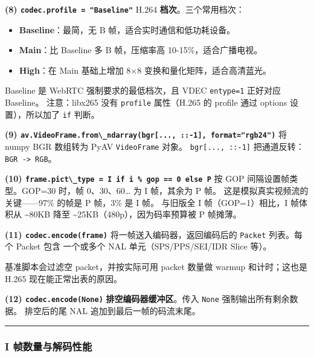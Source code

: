 \textbf{(8) \passthrough{\lstinline!codec.profile = "Baseline"!}} H.264
\textbf{档次}。三个常用档次：

\begin{itemize}
\tightlist
\item
  \textbf{Baseline}：最简，无 B 帧，适合实时通信和低功耗设备。
\item
  \textbf{Main}：比 Baseline 多 B 帧，压缩率高 10-15\%，适合广播电视。
\item
  \textbf{High}：在 Main 基础上增加 8×8 变换和量化矩阵，适合高清蓝光。
\end{itemize}

Baseline 是 WebRTC 强制要求的最低档次，且 VDEC
\passthrough{\lstinline!entype=1!} 正好对应 Baseline。 注意：libx265
没有 \passthrough{\lstinline!profile!} 属性（H.265 的 profile 通过
options 设置），所以加了 \passthrough{\lstinline!if!} 判断。

\textbf{(9)
\passthrough{\lstinline!av.VideoFrame.from\_ndarray(bgr[..., ::-1], format="rgb24")!}}
将 numpy BGR 数组转为 PyAV \passthrough{\lstinline!VideoFrame!} 对象。
\passthrough{\lstinline!bgr[..., ::-1]!}
把通道反转：\passthrough{\lstinline!BGR -> RGB!}。

\textbf{(10)
\passthrough{\lstinline!frame.pict\_type = I if i \% gop == 0 else P!}}
按 GOP 间隔设置帧类型。GOP=30 时，帧 0、30、60\ldots{} 为 I 帧，其余为 P
帧。 这是模拟真实视频流的关键------97\% 的帧是 P 帧，3\% 是 I 帧。
与旧版全 I 帧（GOP=1）相比，I 帧体积从 \textasciitilde80KB 降至
\textasciitilde25KB（480p），因为码率预算被 P 帧摊薄。

\textbf{(11) \passthrough{\lstinline!codec.encode(frame)!}}
将一帧送入编码器，返回编码后的 \passthrough{\lstinline!Packet!}
列表。每个 Packet 包含 一个或多个 NAL 单元（SPS/PPS/SEI/IDR Slice 等）。

基准脚本会过滤空 packet，并按实际可用 packet 数量做 warmup
和计时；这也是 H.265 现在能正常出表的原因。

\textbf{(12) \passthrough{\lstinline!codec.encode(None)!}}
\textbf{排空编码器缓冲区}。传入 \passthrough{\lstinline!None!}
强制输出所有剩余数据。 排空后的尾 NAL 追加到最后一帧的码流末尾。

\begin{center}\rule{0.5\linewidth}{0.5pt}\end{center}

\subsubsection{I 帧数量与解码性能}\label{iframe-performance}

